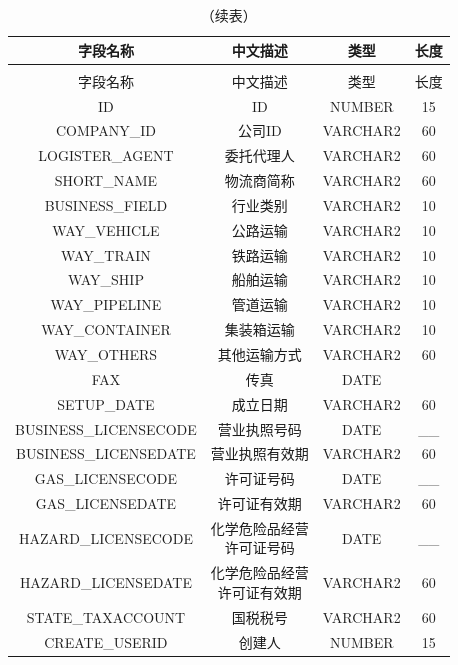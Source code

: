 \begin{appendices}
\begin{longtable}{cccc}
    \caption{企业信息表} \label{tab:企业信息表} \\
	\toprule
	字段名称 & 中文描述 & 类型 & 长度 \\
	\midrule
    \endfirsthead %
    \caption{（续表）} \\ %
    \midrule
    字段名称 & 中文描述 & 类型 & 长度 \\
    \midrule
    \endhead %
    \midrule
    \endfoot %
    \bottomrule
    \endlastfoot %
    ID & ID & NUMBER & 15 \\
    COMPANY\_ID & 公司ID & VARCHAR2 & 60 \\
    LOGISTER\_AGENT & 委托代理人 & VARCHAR2 & 60 \\
    SHORT\_NAME & 物流商简称 & VARCHAR2 & 60 \\
    BUSINESS\_FIELD & 行业类别 & VARCHAR2 & 10 \\
    WAY\_VEHICLE & 公路运输 & VARCHAR2 & 10 \\
    WAY\_TRAIN & 铁路运输 & VARCHAR2 & 10 \\
    WAY\_SHIP & 船舶运输 & VARCHAR2 & 10 \\
    WAY\_PIPELINE & 管道运输 & VARCHAR2 & 10 \\
    WAY\_CONTAINER & 集装箱运输 & VARCHAR2 & 10 \\
    WAY\_OTHERS & 其他运输方式 & VARCHAR2 & 60 \\
    FAX & 传真 & DATE & \\
    SETUP\_DATE & 成立日期 & VARCHAR2 & 60 \\
    BUSINESS\_LICENSECODE & 营业执照号码 & DATE & \_\_ \\
    BUSINESS\_LICENSEDATE & 营业执照有效期 & VARCHAR2 & 60 \\
    GAS\_LICENSECODE & 许可证号码 & DATE & \_\_ \\
    GAS\_LICENSEDATE & 许可证有效期 & VARCHAR2 & 60 \\
    HAZARD\_LICENSECODE & \makecell{化学危险品经营 \\ 许可证号码} & DATE & \_\_ \\
    HAZARD\_LICENSEDATE & \makecell{化学危险品经营 \\ 许可证有效期} & VARCHAR2 & 60 \\
    STATE\_TAXACCOUNT & 国税税号 & VARCHAR2 & 60 \\
    CREATE\_USERID & 创建人 & NUMBER & 15
\end{longtable}


\end{appendices}
